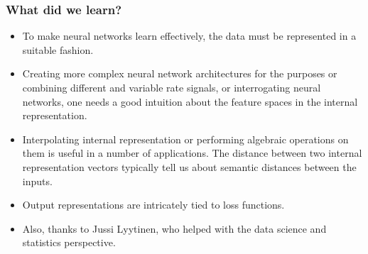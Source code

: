 \documentclass[8pt]{beamer}
\begin{document}
\begin{frame}
\frametitle{What did we learn?}
 \begin{itemize}
  \item To make neural networks learn effectively, the data must be represented in a suitable fashion.
  \item Creating more complex neural network architectures for the purposes or combining different and variable rate signals,
        or interrogating neural networks, one needs a good intuition about the feature spaces in the internal representation.
  \item Interpolating internal representation or performing algebraic operations on them is useful in a number of applications.
        The distance between two internal representation vectors typically tell us about semantic distances between the inputs.
  \item Output representations are intricately tied to loss functions.
  \item Also, thanks to Jussi Lyytinen, who helped with the data science and statistics perspective.
 \end{itemize}
\end{frame}
\end{document}
